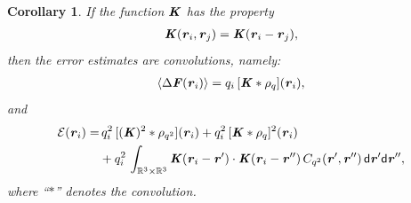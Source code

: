 \documentclass[aps,pre,preprint,unsortedaddress]{revtex4}
\renewcommand{\v}[1]{\textbf{\textit{#1}}}
\renewcommand{\d}[1]{\textsf{#1}}
\newtheorem{corollary}[theorem]{Corollary}
\begin{document}
\begin{corollary}\label{thm:tmp2}
  If the function $\v K$ has the property
  \begin{align}
    \label{eqn:cor-kernel}
    \v K(\v r_i,\v r_j) = \v K(\v r_i - \v r_j),    
  \end{align}
  then the error estimates are convolutions, namely:
  \begin{align}\label{eqn:cor-meanf}
    \langle\Delta\v F(\v r_i)\rangle
    =q_i\, [\v K\ast\rho_q](\v r_i),
  \end{align}
  and 
  \begin{align}\nonumber
    \mathcal E (\v r_i) 
    = &\,
    q_i^2\,[(\v K)^2\ast\rho_{q^2}] (\v r_i) + 
    q_i^2\,[\v K\ast\rho_{q}]^2 (\v r_i) \\\label{eqn:cor-error}
    &+
    q_i^2\,\int_{\mathbb R^3\times\mathbb R^3}
    \v K(\v r_i-\v r')\cdot
    \v K(\v r_i-\v r'')\,
    C_{q^2}(\v r', \v r'')\,
    \d d\v r'\d d\v r'',
  \end{align}
  where ``$\ast$'' denotes the convolution.
\end{corollary}
\end{document}
